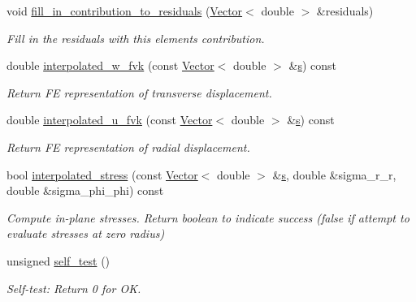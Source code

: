 \begin{DoxyCompactItemize}
void \hyperlink{classoomph_1_1AxisymFoepplvonKarmanEquations_a18148b60b9a4addc513f1aed354bd63d}{fill\+\_\+in\+\_\+contribution\+\_\+to\+\_\+residuals} (\hyperlink{classoomph_1_1Vector}{Vector}$<$ double $>$ \&residuals)
\begin{DoxyCompactList}\small\item\em Fill in the residuals with this element\textquotesingle{}s contribution. \end{DoxyCompactList}\item 
double \hyperlink{classoomph_1_1AxisymFoepplvonKarmanEquations_aca5188335be3d0432fbf92d493026558}{interpolated\+\_\+w\+\_\+fvk} (const \hyperlink{classoomph_1_1Vector}{Vector}$<$ double $>$ \&\hyperlink{cfortran_8h_ab7123126e4885ef647dd9c6e3807a21c}{s}) const
\begin{DoxyCompactList}\small\item\em Return FE representation of transverse displacement. \end{DoxyCompactList}\item 
double \hyperlink{classoomph_1_1AxisymFoepplvonKarmanEquations_ac24fc0416243162170ad09c7f3261ebd}{interpolated\+\_\+u\+\_\+fvk} (const \hyperlink{classoomph_1_1Vector}{Vector}$<$ double $>$ \&\hyperlink{cfortran_8h_ab7123126e4885ef647dd9c6e3807a21c}{s}) const
\begin{DoxyCompactList}\small\item\em Return FE representation of radial displacement. \end{DoxyCompactList}\item 
bool \hyperlink{classoomph_1_1AxisymFoepplvonKarmanEquations_a22d4a63c862395cae211773748c4c896}{interpolated\+\_\+stress} (const \hyperlink{classoomph_1_1Vector}{Vector}$<$ double $>$ \&\hyperlink{cfortran_8h_ab7123126e4885ef647dd9c6e3807a21c}{s}, double \&sigma\+\_\+r\+\_\+r, double \&sigma\+\_\+phi\+\_\+phi) const
\begin{DoxyCompactList}\small\item\em Compute in-\/plane stresses. Return boolean to indicate success (false if attempt to evaluate stresses at zero radius) \end{DoxyCompactList}\item 
unsigned \hyperlink{classoomph_1_1AxisymFoepplvonKarmanEquations_a2ececacf1a7dd89188a4a20e5abbb7c0}{self\+\_\+test} ()
\begin{DoxyCompactList}\small\item\em Self-\/test\+: Return 0 for OK. \end{DoxyCompactList}\item 

\end{DoxyCompactItemize}
